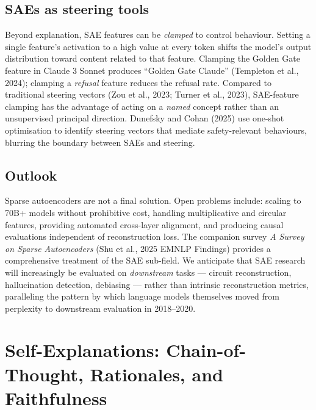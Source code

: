 \documentclass{article}
\begin{document}
\subsection{SAEs as steering tools}\label{saes-as-steering-tools}

Beyond explanation, SAE features can be \emph{clamped} to control behaviour. Setting a single feature's activation to a high value at every token shifts the model's output distribution toward content related to that feature. Clamping the Golden Gate feature in Claude 3 Sonnet produces ``Golden Gate Claude'' (Templeton et al., 2024); clamping a \emph{refusal} feature reduces the refusal rate. Compared to traditional steering vectors (Zou et al., 2023; Turner et al., 2023), SAE-feature clamping has the advantage of acting on a \emph{named} concept rather than an unsupervised principal direction. Dunefsky and Cohan (2025) use one-shot optimisation to identify steering vectors that mediate safety-relevant behaviours, blurring the boundary between SAEs and steering.

\subsection{Outlook}\label{outlook}

Sparse autoencoders are not a final solution. Open problems include: scaling to 70B+ models without prohibitive cost, handling multiplicative and circular features, providing automated cross-layer alignment, and producing causal evaluations independent of reconstruction loss. The companion survey \emph{A Survey on Sparse Autoencoders} (Shu et al., 2025 EMNLP Findings) provides a comprehensive treatment of the SAE sub-field. We anticipate that SAE research will increasingly be evaluated on \emph{downstream} tasks --- circuit reconstruction, hallucination detection, debiasing --- rather than intrinsic reconstruction metrics, paralleling the pattern by which language models themselves moved from perplexity to downstream evaluation in 2018--2020.

\section{Self-Explanations: Chain-of-Thought, Rationales, and Faithfulness}\label{self-explanations-chain-of-thought-rationales-and-faithfulness}
\end{document}
